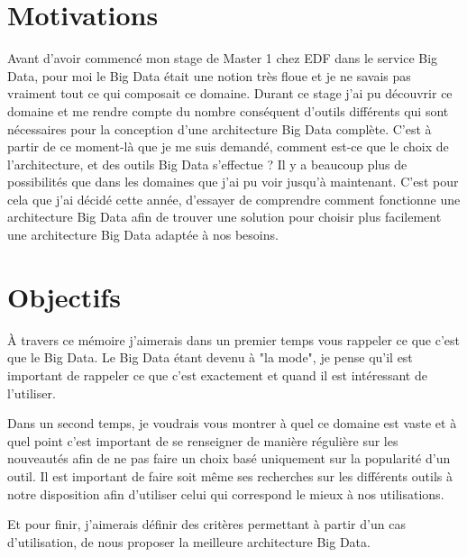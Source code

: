 \documentclass[12pt, twoside, openright]{report}
\begin{document}
\leavevmode\thispagestyle{empty}\newpage


\section*{Motivations}
Avant d'avoir commencé mon stage de Master 1 chez EDF dans le service Big Data, pour moi le Big Data était une notion très floue et je ne savais pas vraiment tout ce qui composait ce domaine. Durant ce stage j'ai pu découvrir ce domaine et me rendre compte du nombre conséquent d'outils différents qui sont nécessaires pour la conception d'une architecture Big Data complète. C'est à partir de ce moment-là que je me suis demandé, comment est-ce que le choix de l'architecture, et des outils Big Data s'effectue ? Il y a beaucoup plus de possibilités que dans les domaines que j'ai pu voir jusqu'à maintenant. C'est pour cela que j'ai décidé cette année, d'essayer de comprendre comment fonctionne une architecture Big Data afin de trouver une solution pour choisir plus facilement une architecture Big Data adaptée à nos besoins. 

\section*{Objectifs}

À travers ce mémoire j'aimerais dans un premier temps vous rappeler ce que c'est que le Big Data. Le Big Data étant devenu à "la mode", je pense qu'il est important de rappeler ce que c'est exactement et quand il est intéressant de l'utiliser.

Dans un second temps, je voudrais vous montrer à quel ce domaine est vaste et à quel point c'est important de se renseigner de manière régulière sur les nouveautés afin de ne pas faire un choix basé uniquement sur la popularité d'un outil. Il est important de faire soit même ses recherches sur les différents outils à notre disposition afin d'utiliser celui qui correspond le mieux à nos utilisations.

Et pour finir, j'aimerais définir des critères permettant à partir d'un cas d'utilisation, de nous proposer la meilleure architecture Big Data.


\leavevmode\thispagestyle{empty}\newpage

\end{document}
